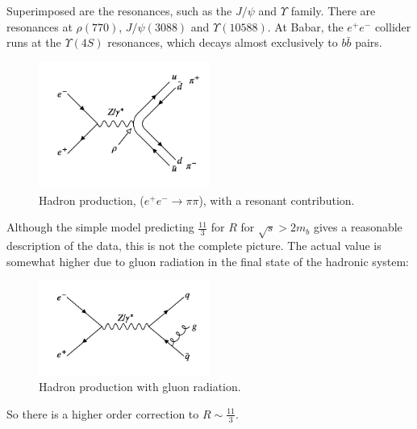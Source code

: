 \diagram

Superimposed are the resonances, such as the $J/\psi$ and $\Upsilon$ family.  There are resonances at $\rho(770)$, $J/\psi(3088)$ and $\Upsilon(10588)$.  At Babar, the $e^+e^-$ collider runs at the $\Upsilon(4S)$ resonances, which decays almost exclusively to $b\bar{b}$ pairs.

\begin{figure}[!htb]
  \begin{center}
    \includegraphics[width=0.5\textwidth]{images/web_feynman/image_31.png}
    \caption[Hadron production ($e^+e^-\to\pi\pi$)]{Hadron production, ($e^+e^-\to\pi\pi$), with a resonant contribution.}
    \label{fig:ch8_EpEmToPiPi}
  \end{center}
\end{figure}

Although the simple model predicting $\frac{11}{3}$ for $R$ for $\sqrt{s}>2m_b$ gives a reasonable description of the data, this is not the complete picture.  The actual value is somewhat higher due to gluon radiation in the final state of the hadronic system:

\begin{figure}[!htb]
  \begin{center}
    \includegraphics[width=0.5\textwidth]{images/web_feynman/image_32.png}
    \caption[Hadron production with gluon radiation]{Hadron production with gluon radiation.}
    \label{fig:ch8_EpEmToQQG}
  \end{center}
\end{figure}

So there is a higher order correction to $R\sim\frac{11}{3}$.


